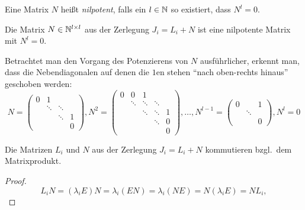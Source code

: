 \begin{definition}[Wiederholung]
    Eine Matrix $N$ heißt \emph{nilpotent}, falls ein $l \in \mathbb{N}$ so existiert, dass $N^l = 0$.
\end{definition}

\begin{corollary}
    Die Matrix $N \in \mathbb{N}^{l \times l}$ aus der Zerlegung $J_i = L_i + N$ ist eine nilpotente Matrix mit $N^l = 0$.
\end{corollary}

Betrachtet man den Vorgang des Potenzierens von $N$ ausführlicher, erkennt man,
dass die Nebendiagonalen auf denen die $1$en stehen \enquote{nach oben-rechts hinaus} geschoben werden:
\begin{equation*}
    N = \begin{pmatrix}
             0 & 1      &        & \\
               & \ddots & \ddots & \\
               &        & \ddots & 1\\
               &        &        & 0
         \end{pmatrix},
    N^2 = \begin{pmatrix}
               0 & 0      & 1      &        & \\
                 & \ddots & \ddots & \ddots & \\
                 &        & \ddots & \ddots & 1\\
                 &        &        & \ddots & 0\\
                 &        &        &        & 0
           \end{pmatrix},
    \dots,
    N^{l-1} = \begin{pmatrix}
                   0 &        & 1\\
                     & \ddots & \\
                     &        & 0
              \end{pmatrix},
    N^l = \mathfrak{0}
\end{equation*}

\begin{lemma}
    Die Matrizen $L_i$ und $N$ aus der Zerlegung $J_i = L_i + N$ kommutieren bzgl.\ dem Matrixprodukt.
\end{lemma}

\begin{proof}
    \begin{equation*}
        L_i N = (\lambda_i E) N = \lambda_i (EN) = \lambda_i (NE) = N (\lambda_i E) = N L_i,
    \end{equation*}
\end{proof}

